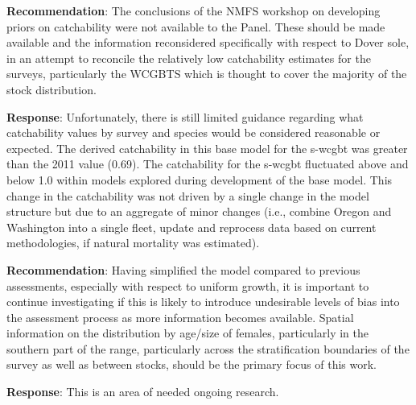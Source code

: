 \documentclass[11pt,
  english,
  a4paper,
]{article}
\begin{document}
\leavevmode\tagmcend\tagstructend\par


\textbf{Recommendation}: The conclusions of the NMFS workshop on developing priors on catchability were not available to the Panel. These should be made available and the information reconsidered specifically with respect to Dover sole, in an attempt to reconcile the relatively low catchability estimates for the surveys, particularly the WCGBTS which is thought to cover the majority of the stock distribution.

\leavevmode\tagmcend\tagstructend\par


\textbf{Response}: Unfortunately, there is still limited guidance regarding what catchability values by survey and species would be considered reasonable or expected. The derived catchability in this base model for the \gls{s-wcgbt} was greater than the 2011 value (0.69). The catchability for the \gls{s-wcgbt} fluctuated above and below 1.0 within models explored during development of the base model. This change in the catchability was not driven by a single change in the model structure but due to an aggregate of minor changes (i.e., combine Oregon and Washington into a single fleet, update and reprocess data based on current methodologies, if natural mortality was estimated).

\leavevmode\tagmcend\tagstructend\par


\textbf{Recommendation}: Having simplified the model compared to previous assessments, especially with respect to uniform growth, it is important to continue investigating if this is likely to introduce undesirable levels of bias into the assessment process as more information becomes available. Spatial information on the distribution by age/size of females, particularly in the southern part of the range, particularly across the stratification boundaries of the survey as well as between stocks, should be the primary focus of this work.

\leavevmode\tagmcend\tagstructend\par


\textbf{Response}: This is an area of needed ongoing research.
\end{document}
